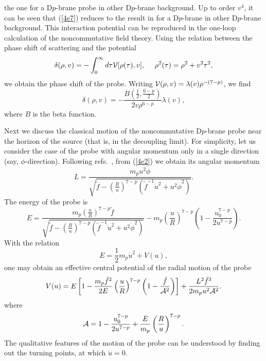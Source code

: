 \documentclass[a4paper,12pt]{article}
\begin{document}
the one for a D$p$-brane probe in other D$p$-brane background. Up to order
$v^4$, it can be seen that (\ref{4e7}) reduces to the result in \cite{Mald3}
for a D$p$-brane in other D$p$-brane background. This interaction potential
can be reproduced in the one-loop calculation of the noncommutative field
theory. Using the relation between the phase shift of scattering and the
potential~\cite{Chep1}
\begin{equation}
\delta (\rho,v) =-\int^{\infty}_0 d\tau {\cal V}[\rho(\tau),v],
\ \ \ \ \rho^2(\tau) =\rho^2 +v^2 \tau^2,
\end{equation}
we obtain the phase shift of the probe. Writing ${\cal V}(\rho,v)=
\lambda(v)\rho^{-(7-p)}$, we find
\begin{equation}
\delta (\rho,v) = -\frac{B\left(\frac{1}{2}, \frac{6-p}{2}\right)}
{2v \rho^{6-p}} \lambda (v),
\end{equation}
where $B$ is the beta function.

Next we discuss the classical motion of the noncommutative D$p$-brane probe
near the horizon of the source (that is, in the decoupling limit). For
simplicity, let us consider the case of the probe with angular momentum
only in a single direction (say, $\phi$-direction). Following
refs.~\cite{Liu,Youm}, from (\ref{4e2}) we
obtain its angular momentum
\begin{equation}
L=\frac{m_p u^2 \dot{\phi}}{
 \sqrt{\tilde{f} -\left(\frac{R}{u}\right)^{7-p}
 \left(\tilde{f}^{-1}\dot{u}^2 +u^2\dot{\phi}^2\right)} }.
\end{equation}
The energy of the probe is
\begin{equation}
E = \frac{m_p\left(\frac{u}{R}\right)^{7-p}\tilde{f}}{
 \sqrt{\tilde{f} -\left(\frac{R}{u}\right)^{7-p}
 \left(\tilde{f}^{-1}\dot{u}^2 +u^2\dot{\phi}^2\right)}}
 -m_p\left(\frac{u}{R}\right)^{7-p}\left (1
 -\frac{u_0^{7-p}}{2u^{7-p}} \right ).
\end{equation}
With the relation
\begin{equation}
E= \frac{1}{2}m_p \dot{u}^2 + V(u),
\end{equation}
one may obtain an effective central potential of the radial motion of the
probe
\begin{equation}
\label{4e14}
V(u)=E\left[1 -\frac{m_p \tilde{f}^2}{2E}\left(\frac{u}{R}\right)^{7-p}
 \left (1-\frac{\tilde{f}}{{\cal A}^2}\right)\right]
 +\frac{L^2 \tilde{f}^3}{2m_p u^2 {\cal A}^2}.
\end{equation}
where
\begin{equation}
{\cal A}= 1-\frac{u_0^{7-p}}{2u^{7-p}}+\frac{E}{m_p}
 \left(\frac{R}{u}\right)^{7-p}.
\end{equation}
The qualitative features of the motion of the probe can be understood by
finding out the turning points, at which $\dot{u}=0$.
\end{document}
